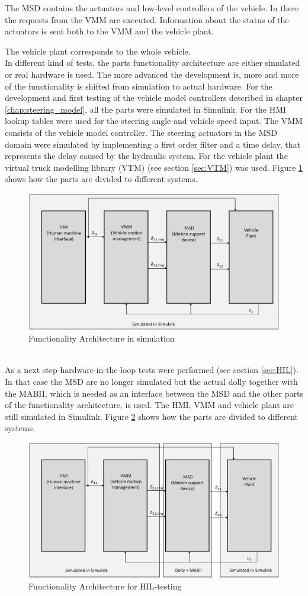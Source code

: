 \documentclass[ExampleMasters.tex]{subfiles}
\begin{document}
The MSD contains the actuators and low-level controllers of the vehicle. In there the requests from the VMM are executed. Information about the status of the actuators is sent both to the VMM and the vehicle plant.

The vehicle plant corresponds to the whole vehicle.
\\
In different kind of tests, the parts functionality architecture are either simulated or real hardware is used. The more advanced the development is, more and more of the functionality is shifted from simulation to actual hardware. For the development and first testing of the vehicle model controllers described in chapter \ref{chap:steering_model}, all the parts were simulated in Simulink. For the HMI lookup tables were used for the steering angle and vehicle speed input. The VMM consists of the vehicle model controller. The steering actuators in the MSD domain were simulated by implementing a first order filter and a time delay, that represents the delay caused by the hydraulic system. For the vehicle plant the virtual truck modelling library (VTM) (see section \ref{sec:VTM}) was used. Figure \ref{fig:funct_architecture_sim} shows how the parts are divided to different systems.
\begin{figure}[h]
	\centering
	\includegraphics[width=0.5\linewidth]{figures/functionality_architecture_sim}
	
	\caption{Functionality Architecture in simulation}
	\label{fig:funct_architecture_sim}
\end{figure}\\
As a next step hardware-in-the-loop tests were performed (see section \ref{sec:HIL}). In that case the MSD are no longer simulated but the actual dolly together with the MABII, which is needed as an interface between the MSD and the other parts of the functionality architecture, is used. The HMI, VMM and vehicle plant are still simulated in Simulink. Figure \ref{fig:funct_architecture_hil} shows how the parts are divided to different systems.
\begin{figure}[h]
	\centering
	\includegraphics[width=0.5\linewidth]{figures/functionality_architecture_hil}
	
	\caption{Functionality Architecture for HIL-testing}
	\label{fig:funct_architecture_hil}
\end{figure}\\
\end{document}
